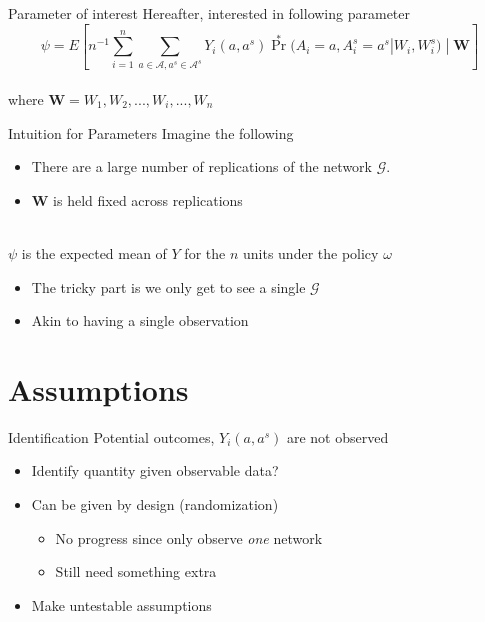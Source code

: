 \documentclass{beamer}
\begin{document}
\begin{frame}{Parameter of interest}
	Hereafter, interested in following parameter
	\[\psi = E\left[ n^{-1} \sum_{i=1}^{n} \sum_{a\in \mathcal{A}, a^s \in \mathcal{A}^s} Y_i(a,a^s) \Pr^*(A_i=a, A_i^s=a^s | W_i, W_i^s) \; | \; \mathbf{W} \right]\]
	~\\
	where $\mathbf{W} = W_1, W_2, ..., W_i, ..., W_n$ 
\end{frame}

\begin{frame}{Intuition for Parameters}
	Imagine the following
	\begin{itemize}
		\item There are a large number of replications of the network $\mathcal{G}$. 
		\item $\mathbf{W}$ is held fixed across replications
	\end{itemize}~\\
	$\psi$ is the expected mean of $Y$ for the $n$ units under the policy $\omega$
	\begin{itemize}
		\item The tricky part is we only get to see a single $\mathcal{G}$
		\item Akin to having a single observation
	\end{itemize}
\end{frame}

\section{Assumptions}

\begin{frame}{Identification}
	Potential outcomes, $Y_i(a,a^s)$ are not observed
	\begin{itemize}
		\item Identify quantity given observable data?
		\item Can be given by design (randomization)
		\begin{itemize}
			\item No progress since only observe \textit{one} network
			\item Still need something extra
		\end{itemize}
		\item Make untestable assumptions
	\end{itemize}
\end{frame}
\end{document}
